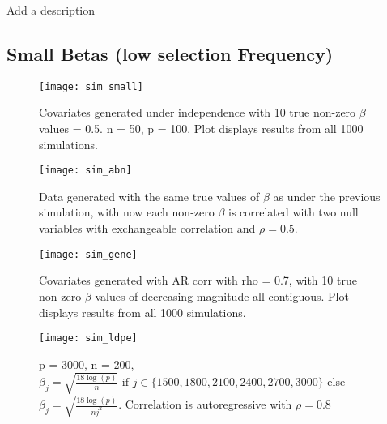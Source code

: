 \begin{table}[hb]
    \centering
    
    \caption{\label{Tab:sim_grp_opposite_dir_balanced_selection_freq}Add a description}
  \end{table}

\subsection{Small Betas (low selection Frequency)}

\begin{figure}[hbtp]
    \begin{center}
    \texttt{[image: sim\_small]}
    \caption{\label{Fig:sim_small} Covariates generated under independence with 10 true non-zero $\beta$ values = 0.5. n = 50, p = 100. Plot displays results from all 1000 simulations.}
    \end{center}
\end{figure}


\begin{figure}[hbtp]
    \begin{center}
    \texttt{[image: sim\_abn]}
    \caption{\label{Fig:sim_abn} Data generated with the same true values of $\beta$ as under the previous simulation, with now each non-zero $\beta$ is correlated with two null variables with exchangeable correlation and $\rho = 0.5$.}
    \end{center}
\end{figure}


\begin{figure}[hbtp]
    \begin{center}
    \texttt{[image: sim\_gene]}
    \caption{\label{Fig:sim_gene} Covariates generated with AR corr with rho = 0.7, with 10 true non-zero $\beta$ values of decreasing magnitude all contiguous. Plot displays results from all 1000 simulations.}
    \end{center}
\end{figure}

\begin{figure}[hbtp]
    \begin{center}
    \texttt{[image: sim\_ldpe]}
    \caption{\label{Fig:sim_ldpe} p = 3000, n = 200, $\beta_j = \sqrt{\frac{18\log(p)}{n}} \text{ if } j \in \lbrace 1500, 1800, 2100, 2400, 2700, 3000 \rbrace$ else $\beta_j = \sqrt{\frac{18\log(p)}{nj^2}}$. Correlation is autoregressive with $\rho = 0.8$}
    \end{center}
\end{figure}


